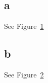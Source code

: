 \documentclass[a4paper,11pt]{article}
\theoremstyle{mytheor}
\begin{document}
\subsection*{a}
See Figure~\ref{fig:2a}
\begin{figure}[t]
	\label{fig:2a}
\end{figure}

\subsection*{b}
See Figure~\ref{fig:2b}
\begin{figure}[t]
	\label{fig:2b}
\end{figure}
\end{document}
